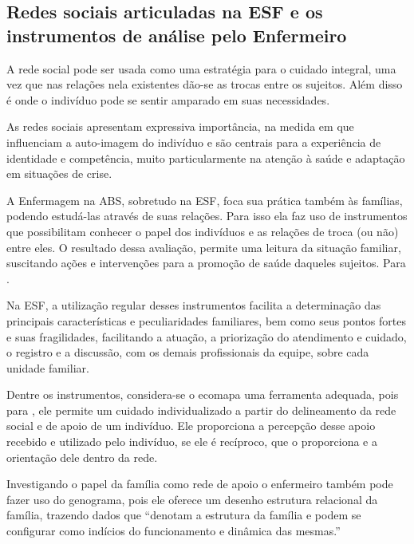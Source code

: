 \subsection{Redes sociais articuladas na ESF e os instrumentos de análise pelo Enfermeiro}
A rede social pode ser usada como uma estratégia para o cuidado integral, uma vez que nas relações nela existentes dão-se as trocas entre os sujeitos. Além disso é onde o indivíduo pode se sentir amparado em suas necessidades. 

As redes sociais apresentam expressiva importância, na medida em que influenciam a auto-imagem do indivíduo e são centrais para a experiência de identidade e competência, muito particularmente na atenção à saúde e adaptação em situações de crise. \cite{lima2012rede}

A Enfermagem na \acrshort{ABS}, sobretudo na \acrshort{ESF}, foca sua prática também às famílias, podendo estudá-las através de suas relações. Para isso ela faz uso de instrumentos que possibilitam conhecer o papel dos indivíduos e as relações de troca (ou não) entre eles. O resultado dessa avaliação, permite uma leitura da situação familiar, suscitando ações e intervenções para a promoção de saúde daqueles sujeitos. Para \cite{gisele2013book}.

\begin{citacao}
Na \acrshort{ESF}, a utilização regular desses instrumentos facilita a determinação das principais características e peculiaridades familiares, bem como seus pontos fortes e suas fragilidades, facilitando a atuação, a priorização do atendimento e cuidado, o registro e a discussão, com os demais profissionais da equipe, sobre cada unidade familiar. \cite{gisele2013book}
\end{citacao}

Dentre os instrumentos, considera-se o ecomapa uma ferramenta adequada, pois para \cite[p. 323]{lima2012rede}, ele permite um cuidado individualizado a partir do delineamento da rede social e de apoio de um indivíduo. Ele proporciona a percepção desse apoio recebido e utilizado pelo indivíduo, se ele é recíproco, que o proporciona e a orientação dele dentro da rede. 

Investigando o papel da família como rede de apoio o enfermeiro também pode fazer uso do genograma, pois ele oferece um desenho estrutura relacional da família, trazendo dados que ``denotam a estrutura da família e podem se configurar como indícios do funcionamento e dinâmica das mesmas.'' \cite{wendt2008utilizaccao}

